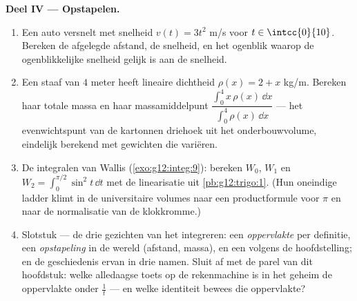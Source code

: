 \begin{problem}
\medskip
\noindent\textbf{Deel IV --- Opstapelen.}
\begin{enumerate}[resume]
  \item Een auto versnelt met snelheid $v(t) = 3t^2$ m/s voor
        $t \in \intcc{0}{10}$. Bereken de afgelegde afstand, de 
        snelheid, en het ogenblik waarop de ogenblikkelijke snelheid gelijk is
        aan de  snelheid.
  \item Een staaf van $4$ meter heeft lineaire dichtheid
        $\rho(x) = 2 + x$ kg/m. Bereken haar totale massa en haar
        massamiddelpunt
        $\dfrac{\int_0^4 x\,\rho(x)\,\dd x}{\int_0^4 \rho(x)\,\dd x}$ --- het
        evenwichtspunt van de kartonnen driehoek uit het onderbouwvolume,
        eindelijk berekend met gewichten die variëren.
  \item De integralen van Wallis (\cref{exo:g12:integ:9}): bereken $W_0$,
        $W_1$ en $W_2 = \int_0^{\pi/2} \sin^2 t\,\dd t$ met de linearisatie
        uit \cref{pb:g12:trigo:1}. (Hun oneindige ladder klimt in de
        universitaire volumes naar een productformule voor $\pi$ en naar de
        normalisatie van de klokkromme.)
  \item Slotstuk --- de drie gezichten van het integreren: een
        \emph{oppervlakte} per definitie, een \emph{opstapeling} in de wereld
        (afstand, massa), en een \emph{} volgens de
        hoofdstelling; en de geschiedenis ervan in drie namen. Sluit af met de
        parel van dit hoofdstuk: welke alledaagse toets op de rekenmachine is
        in het geheim de oppervlakte onder $\frac1t$ --- en welke identiteit
        bewees die oppervlakte?
\end{enumerate}
\end{problem}
